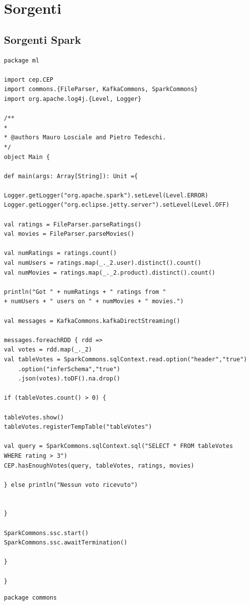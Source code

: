 \documentclass[11pt]{article}
\begin{document}
\section{Sorgenti}
\begin{appendices}
	\section{Sorgenti Spark}
	\begin{lstlisting}[style=scalacode, caption=Main.scala]
package ml

import cep.CEP
import commons.{FileParser, KafkaCommons, SparkCommons}
import org.apache.log4j.{Level, Logger}

/**
*
* @authors Mauro Losciale and Pietro Tedeschi.
*/
object Main {

def main(args: Array[String]): Unit ={

Logger.getLogger("org.apache.spark").setLevel(Level.ERROR)
Logger.getLogger("org.eclipse.jetty.server").setLevel(Level.OFF)

val ratings = FileParser.parseRatings()
val movies = FileParser.parseMovies()

val numRatings = ratings.count()
val numUsers = ratings.map(_._2.user).distinct().count()
val numMovies = ratings.map(_._2.product).distinct().count()

println("Got " + numRatings + " ratings from "
+ numUsers + " users on " + numMovies + " movies.")

val messages = KafkaCommons.kafkaDirectStreaming()

messages.foreachRDD { rdd =>
val votes = rdd.map(_._2)
val tableVotes = SparkCommons.sqlContext.read.option("header","true")
	.option("inferSchema","true")
	.json(votes).toDF().na.drop()

if (tableVotes.count() > 0) {

tableVotes.show()
tableVotes.registerTempTable("tableVotes")

val query = SparkCommons.sqlContext.sql("SELECT * FROM tableVotes WHERE rating > 3")
CEP.hasEnoughVotes(query, tableVotes, ratings, movies)

} else println("Nessun voto ricevuto")


}

SparkCommons.ssc.start()
SparkCommons.ssc.awaitTermination()

}

}
	\end{lstlisting}
	\begin{lstlisting}[style=scalacode, caption=SparkCommons.scala]
		package commons
		

\end{lstlisting}
\end{appendices}
\end{document}
